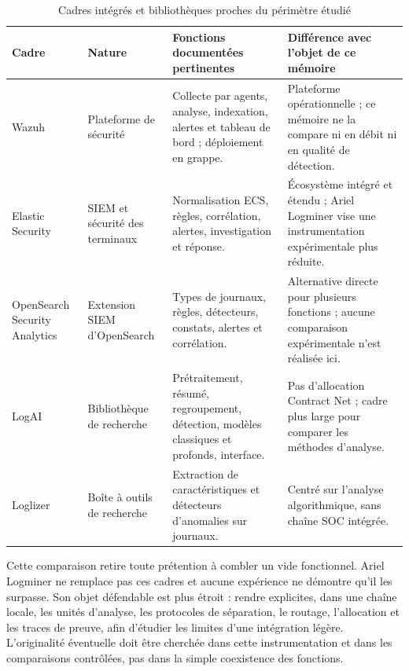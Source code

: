 \begin{table}[H]
\centering
\caption{Cadres intégrés et bibliothèques proches du périmètre étudié}
\label{tab:cadres-integres}
\scriptsize
\begin{tabularx}{\textwidth}{p{2.25cm}p{2.1cm}p{3.5cm}X}
\toprule
\textbf{Cadre} & \textbf{Nature} & \textbf{Fonctions documentées pertinentes} &
\textbf{Différence avec l'objet de ce mémoire} \\
\midrule
Wazuh \cite{wazuh2026architecture} & Plateforme de sécurité &
Collecte par agents, analyse, indexation, alertes et tableau de bord ; déploiement en grappe. &
Plateforme opérationnelle ; ce mémoire ne la compare ni en débit ni en qualité de détection. \\
Elastic Security \cite{elastic2026security} & SIEM et sécurité des terminaux &
Normalisation ECS, règles, corrélation, alertes, investigation et réponse. &
Écosystème intégré et étendu ; Ariel Logminer vise une instrumentation expérimentale plus réduite. \\
OpenSearch Security Analytics \cite{opensearch2026securityanalytics} & Extension SIEM d'OpenSearch &
Types de journaux, règles, détecteurs, constats, alertes et corrélation. &
Alternative directe pour plusieurs fonctions ; aucune comparaison expérimentale n'est réalisée ici. \\
LogAI \cite{cheng2023logai} & Bibliothèque de recherche &
Prétraitement, résumé, regroupement, détection, modèles classiques et profonds, interface. &
Pas d'allocation Contract Net ; cadre plus large pour comparer les méthodes d'analyse. \\
Loglizer \cite{he2016experience,logpai2026loglizer} & Boîte à outils de recherche &
Extraction de caractéristiques et détecteurs d'anomalies sur journaux. &
Centré sur l'analyse algorithmique, sans chaîne SOC intégrée. \\
\bottomrule
\end{tabularx}
\end{table}

Cette comparaison retire toute prétention à combler un vide fonctionnel. Ariel Logminer
ne remplace pas ces cadres et aucune expérience ne démontre qu'il les surpasse. Son objet
défendable est plus étroit : rendre explicites, dans une chaîne locale, les unités
d'analyse, les protocoles de séparation, le routage, l'allocation et les traces de preuve,
afin d'étudier les limites d'une intégration légère. L'originalité éventuelle doit être
cherchée dans cette instrumentation et dans les comparaisons contrôlées, pas dans la
simple coexistence des fonctions.


